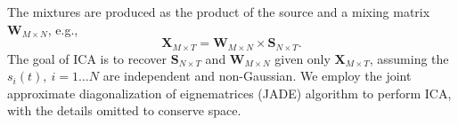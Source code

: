 The mixtures are produced as the product of the source and a mixing matrix $\mathbf{W}_{M \times N}$, e.g.,
\[
    \mathbf{X}_{M \times T} = \mathbf{W}_{M \times N} \times \mathbf{S}_{N \times T}.
\]
The goal of ICA is to recover $\mathbf{S}_{N \times T}$ and $\mathbf{W}_{M \times N}$ given only $\mathbf{X}_{M \times T}$, assuming
the $s_i(t),\ i=1 \ldots N$ are independent and non-Gaussian. We employ the joint approximate diagonalization of eignematrices (JADE) algorithm \cite{de_lathauwer_independent_1996} to perform ICA, with the details omitted to conserve space. 

 
